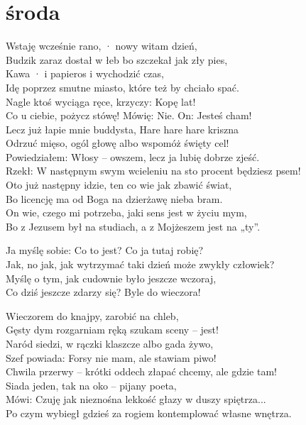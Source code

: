 \section{środa}
\begin{text}
\small{
Wstaję wcześnie rano, · nowy witam dzień,\\
Budzik zaraz dostał w łeb bo szczekał jak zły pies,\\
Kawa · i papieros i wychodzić czas,\\
Idę poprzez smutne miasto, które też by chciało spać.\\
Nagle ktoś wyciąga ręce, krzyczy: Kopę lat!\\
Co u ciebie, pożycz stówę! Mówię: Nie. On: Jesteś cham!\\
Lecz już łapie mnie buddysta, Hare hare hare kriszna\\
Odrzuć mięso, ogól głowę albo wspomóż święty cel!\\
Powiedziałem: Włosy – owszem, lecz ja lubię dobrze zjeść.\\
Rzekł: W następnym swym wcieleniu na sto procent będziesz psem!\\
Oto już następny idzie, ten co wie jak zbawić świat,\\
Bo licencję ma od Boga na dzierżawę nieba bram.\\
On wie, czego mi potrzeba, jaki sens jest w życiu mym,\\
Bo z Jezusem był na studiach, a z Mojżeszem jest na „ty”.

Ja myślę sobie: Co to jest? Co ja tutaj robię?\\
Jak, no jak, jak wytrzymać taki dzień może zwykły człowiek?\\
Myślę o tym, jak cudownie było jeszcze wczoraj,\\
Co dziś jeszcze zdarzy się? Byle do wieczora!

Wieczorem do knajpy, zarobić na chleb,\\
Gęsty dym rozgarniam ręką szukam sceny – jest!\\
Naród siedzi, w rączki klaszcze albo gada żywo,\\
Szef powiada: Forsy nie mam, ale stawiam piwo!\\
Chwila przerwy – krótki oddech złapać chcemy, ale gdzie tam!\\
Siada jeden, tak na oko – pijany poeta,\\
Mówi: Czuję jak nieznośna lekkość głazy w duszy spiętrza...\\
Po czym wybiegł gdzieś za rogiem kontemplować własne wnętrza.

}
\end{text}
